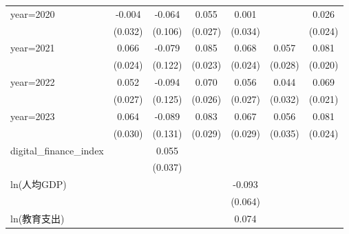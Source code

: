 \begin{table}[htbp]
\begin{tabular}{l*{6}{c}}
\addlinespace
year=2020           &      -0.004         &      -0.064         &       0.055\sym{*}  &       0.001         &                     &       0.026         \\
                    &     (0.032)         &     (0.106)         &     (0.027)         &     (0.034)         &                     &     (0.024)         \\
\addlinespace
year=2021           &       0.066\sym{***}&      -0.079         &       0.085\sym{***}&       0.068\sym{***}&       0.057\sym{*}  &       0.081\sym{***}\\
                    &     (0.024)         &     (0.122)         &     (0.023)         &     (0.024)         &     (0.028)         &     (0.020)         \\
\addlinespace
year=2022           &       0.052\sym{*}  &      -0.094         &       0.070\sym{**} &       0.056\sym{**} &       0.044         &       0.069\sym{***}\\
                    &     (0.027)         &     (0.125)         &     (0.026)         &     (0.027)         &     (0.032)         &     (0.021)         \\
\addlinespace
year=2023           &       0.064\sym{**} &      -0.089         &       0.083\sym{***}&       0.067\sym{**} &       0.056         &       0.081\sym{***}\\
                    &     (0.030)         &     (0.131)         &     (0.029)         &     (0.029)         &     (0.035)         &     (0.024)         \\
\addlinespace
digital\_finance\_index&                     &       0.055         &                     &                     &                     &                     \\
                    &                     &     (0.037)         &                     &                     &                     &                     \\
\addlinespace
ln(人均GDP)         &                     &                     &                     &      -0.093         &                     &                     \\
                    &                     &                     &                     &     (0.064)         &                     &                     \\
\addlinespace
ln(教育支出)        &                     &                     &                     &       0.074         &                     &                     \\

\end{tabular}
\end{table}
